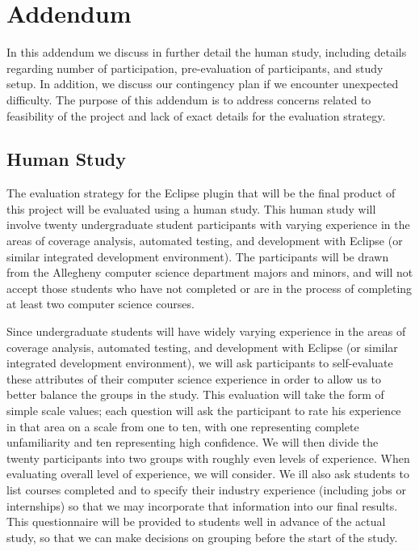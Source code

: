 %
%

\chapter{Addendum}\label{appa:add}


In this addendum we discuss in further detail the human study, including
details regarding number of participation, pre-evaluation of participants,
and study setup.  In addition, we discuss our contingency plan if we
encounter unexpected difficulty.  The purpose of this addendum is to address
concerns related to feasibility of the project and lack of exact details for
the evaluation strategy.

\section{Human Study}\label{sec:addhs}

The evaluation strategy for the Eclipse plugin that will be the final product
of this project will be evaluated using a human study.  This human study will
involve twenty undergraduate student participants with varying experience in
the areas of coverage analysis, automated testing, and development with Eclipse
(or similar integrated development environment).  The participants will be drawn 
from the Allegheny computer science department majors and minors, and will not
accept those students who have not completed or are in the process of completing
at least two computer science courses.

Since undergraduate students will have widely varying experience in
the areas of coverage analysis, automated testing, and development with Eclipse
(or similar integrated development environment), we will ask participants
to self-evaluate these attributes of their computer science experience in order
to allow us to better balance the groups in the study.  This evaluation will
take the form of simple scale values; each question will ask the participant
to rate his experience in that area on a scale from one to ten, with one representing
complete unfamiliarity and ten representing high confidence.  We will then divide
the twenty participants into two groups with roughly even levels of experience.  
When evaluating overall level of experience, we will consider.  We ill also ask students 
to list courses completed and to specify their industry
experience (including jobs or internships) so that we may incorporate that information
into our final results.  This questionnaire will be provided to students well in advance
of the actual study, so that we can make decisions on grouping before the start of
the study.

